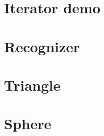 \documentclass[11pt, listof=totoc]{article}
\begin{document}
  \thispagestyle{empty} \makeheading \tableofcontents \newpage \setcounter{page}{1}

  \section{Iterator demo}       
  \newpage \section{Recognizer} 
  \newpage \section{Triangle}   
  \newpage \section{Sphere}     

	\newpage \nocite{*}
  \renewcommand{\refname}{\thesection. References} 
  \printbibliography
   
\end{document}
